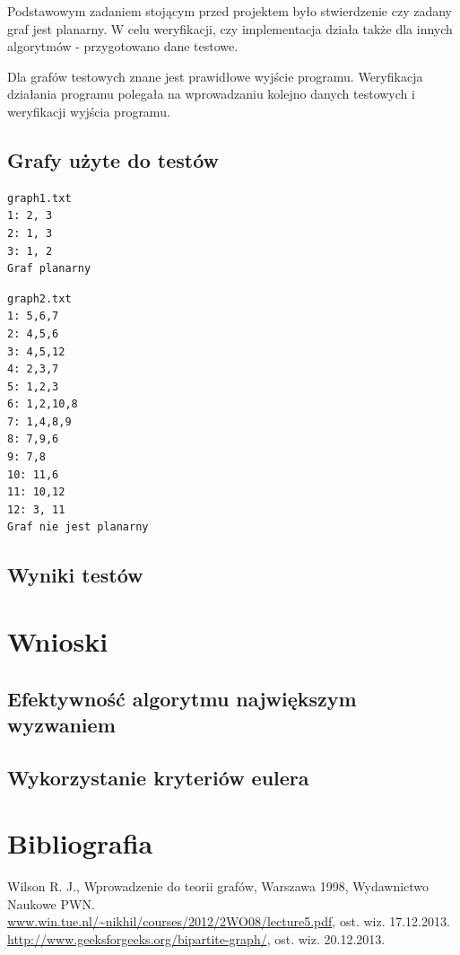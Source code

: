 \documentclass[a4 122pt]{article}
\begin{document}
		Podstawowym zadaniem stojącym przed projektem było stwierdzenie czy zadany graf jest planarny.
		W celu weryfikacji, czy implementacja działa także dla innych algorytmów - przygotowano dane testowe.
		
		Dla grafów testowych znane jest prawidłowe wyjście programu. Weryfikacja działania programu polegała na wprowadzaniu kolejno danych testowych i weryfikacji wyjścia programu.		

	\subsection{Grafy użyte do testów}

\begin{verbatim}
graph1.txt
1: 2, 3
2: 1, 3
3: 1, 2
Graf planarny
\end{verbatim}

\begin{verbatim}
graph2.txt
1: 5,6,7
2: 4,5,6
3: 4,5,12
4: 2,3,7
5: 1,2,3
6: 1,2,10,8
7: 1,4,8,9
8: 7,9,6
9: 7,8
10: 11,6
11: 10,12
12: 3, 11
Graf nie jest planarny
\end{verbatim}
	\subsection{Wyniki testów}

\section{Wnioski}

	\subsection{Efektywność algorytmu największym wyzwaniem}
	\subsection{Wykorzystanie kryteriów eulera}

\section{Bibliografia}

		Wilson R. J., Wprowadzenie do teorii grafów, Warszawa 1998, Wydawnictwo Naukowe PWN.\\[0.3cm]
		\url{www.win.tue.nl/~nikhil/courses/2012/2WO08/lecture5.pdf}, ost. wiz. 17.12.2013.\\[0.3cm]
		\url{http://www.geeksforgeeks.org/bipartite-graph/}, ost. wiz. 20.12.2013.
\end{document}
